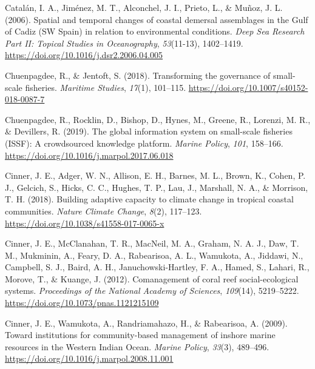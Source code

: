 \documentclass[
  12pt,
]{article}
\newlength{\cslhangindent}
\newlength{\cslentryspacingunit} %
\newenvironment{CSLReferences}[2] %
 {%
  \setlength{\parindent}{0pt}
  \ifodd #1
  \let\oldpar\par
  \def\par{\hangindent=\cslhangindent\oldpar}
  \fi
  \setlength{\parskip}{#2\cslentryspacingunit}
 }%
 {}
\begin{document}
\begin{CSLReferences}{1}{2}
\leavevmode{}%
Catalán, I. A., Jiménez, M. T., Alconchel, J. I., Prieto, L., \& Muñoz, J. L. (2006). Spatial and temporal changes of coastal demersal assemblages in the {Gulf} of {Cadiz} ({SW} {Spain}) in relation to environmental conditions. \emph{Deep Sea Research Part II: Topical Studies in Oceanography}, \emph{53}(11-13), 1402--1419. \url{https://doi.org/10.1016/j.dsr2.2006.04.005}

\leavevmode{}%
Chuenpagdee, R., \& Jentoft, S. (2018). Transforming the governance of small-scale fisheries. \emph{Maritime Studies}, \emph{17}(1), 101--115. \url{https://doi.org/10.1007/s40152-018-0087-7}

\leavevmode{}%
Chuenpagdee, R., Rocklin, D., Bishop, D., Hynes, M., Greene, R., Lorenzi, M. R., \& Devillers, R. (2019). The global information system on small-scale fisheries ({ISSF}): {A} crowdsourced knowledge platform. \emph{Marine Policy}, \emph{101}, 158--166. \url{https://doi.org/10.1016/j.marpol.2017.06.018}

\leavevmode{}%
Cinner, J. E., Adger, W. N., Allison, E. H., Barnes, M. L., Brown, K., Cohen, P. J., Gelcich, S., Hicks, C. C., Hughes, T. P., Lau, J., Marshall, N. A., \& Morrison, T. H. (2018). Building adaptive capacity to climate change in tropical coastal communities. \emph{Nature Climate Change}, \emph{8}(2), 117--123. \url{https://doi.org/10.1038/s41558-017-0065-x}

\leavevmode{}%
Cinner, J. E., McClanahan, T. R., MacNeil, M. A., Graham, N. A. J., Daw, T. M., Mukminin, A., Feary, D. A., Rabearisoa, A. L., Wamukota, A., Jiddawi, N., Campbell, S. J., Baird, A. H., Januchowski-Hartley, F. A., Hamed, S., Lahari, R., Morove, T., \& Kuange, J. (2012). Comanagement of coral reef social-ecological systems. \emph{Proceedings of the National Academy of Sciences}, \emph{109}(14), 5219--5222. \url{https://doi.org/10.1073/pnas.1121215109}

\leavevmode{}%
Cinner, J. E., Wamukota, A., Randriamahazo, H., \& Rabearisoa, A. (2009). Toward institutions for community-based management of inshore marine resources in the {Western} {Indian} {Ocean}. \emph{Marine Policy}, \emph{33}(3), 489--496. \url{https://doi.org/10.1016/j.marpol.2008.11.001}


\end{CSLReferences}
\end{document}
